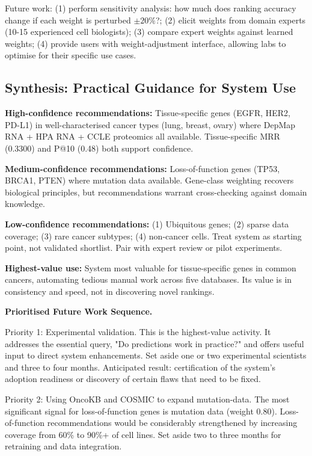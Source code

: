 \documentclass[author={Karen Coutinho, Ishaan Bhalla, Aman Raj, Dixit Kaloorani Malarmannan},
                supervisor={Dr. Daniel D'Andrea},
                degree={MSc},
                title={CellSelector Omics: A Multi-Omics Recommendation System for Cell Line Selection},
                subtitle={},
                type={},
                year={2026}]{dissertation}
\begin{document}
Future work: (1) perform sensitivity analysis: how much does ranking accuracy change if each weight is perturbed $\pm 20\%$?; (2) elicit weights from domain experts (10-15 experienced cell biologists); (3) compare expert weights against learned weights; (4) provide users with weight-adjustment interface, allowing labs to optimise for their specific use cases.

\subsection*{Synthesis: Practical Guidance for System Use}

{\bf High-confidence recommendations:} Tissue-specific genes (EGFR, HER2, PD-L1) 
in well-characterised cancer types (lung, breast, ovary) where DepMap RNA + HPA 
RNA + CCLE proteomics all available. Tissue-specific MRR (0.3300) and P@10 (0.48) 
both support confidence.

{\bf Medium-confidence recommendations:} Loss-of-function genes (TP53, BRCA1, PTEN) 
where mutation data available. Gene-class weighting recovers biological principles, 
but recommendations warrant cross-checking against domain knowledge.

{\bf Low-confidence recommendations:} (1) Ubiquitous genes; (2) sparse data coverage; 
(3) rare cancer subtypes; (4) non-cancer cells. Treat system as starting point, not 
validated shortlist. Pair with expert review or pilot experiments.

{\bf Highest-value use:} System most valuable for tissue-specific genes in common 
cancers, automating tedious manual work across five databases. Its value is in 
consistency and speed, not in discovering novel rankings.


{\bf Prioritised Future Work Sequence.}

Priority 1: Experimental validation. This is the highest-value activity. It addresses the essential query, "Do predictions work in practice?" and offers useful input to direct system enhancements. Set aside one or two experimental scientists and three to four months. Anticipated result: certification of the system's adoption readiness or discovery of certain flaws that need to be fixed.

Priority 2: Using OncoKB and COSMIC to expand mutation-data. The most significant signal for loss-of-function genes is mutation data (weight 0.80). Loss-of-function recommendations would be considerably strengthened by increasing coverage from 60\% to 90\%+ of cell lines. Set aside two to three months for retraining and data integration.
\end{document}
